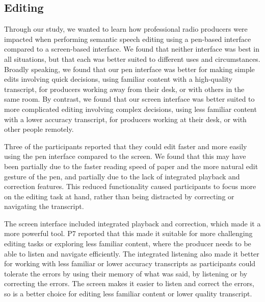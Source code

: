 
\subsection{Editing}


Through our study, we wanted to learn how professional radio producers were impacted when performing semantic speech
editing using a pen-based interface compared to a screen-based interface.  We found that neither interface was best in
all situations, but that each was better suited to different uses and circumstances.  Broadly speaking, we found that
our pen interface was better for making simple edits involving quick decisions, using familiar content with a
high-quality transcript, for producers working away from their desk, or with others in the same room.  By contrast, we
found that our screen interface was better suited to more complicated editing involving complex decisions, using less
familiar content with a lower accuracy transcript, for producers working at their desk, or with other people remotely.

Three of the participants reported that they could edit faster and more easily using the pen interface compared to the
screen.
We found that this may have been partially due to the faster reading speed of paper and the more natural edit gesture
of the pen, and partially due to the lack of integrated playback and correction features.  This reduced functionality
caused participants to focus more on the editing task at hand, rather than being distracted by correcting or navigating
the transcript.

The screen interface included integrated playback and correction, which made it a more powerful tool.  P7 reported that
this made it suitable for more challenging editing tasks or exploring less familiar content, where the producer needs
to be able to listen and navigate efficiently. The integrated listening also made it better for working with less
familiar or lower accuracy transcripts as participants could tolerate the errors by using their memory of what was
said, by listening or by correcting the errors. The screen makes it easier to listen and correct the errors, so is a
better choice for editing less familiar content or lower quality transcript. 

